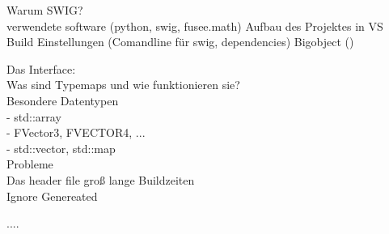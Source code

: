  \label{sec:Umsetzung}


Warum SWIG?\\
verwendete software (python, swig, fusee.math)
Aufbau des Projektes in VS\\
Build Einstellungen (Comandline für swig, dependencies)
Bigobject (\bobj)

Das Interface:\\
	Was sind Typemaps und wie funktionieren sie?\\
	Besondere Datentypen\\
		- std::array\\
		- FVector3, FVECTOR4, ...\\
		- std::vector, std::map\\
		
	Probleme\\
	Das header file groß lange Buildzeiten\\
	Ignore Genereated
		
....

